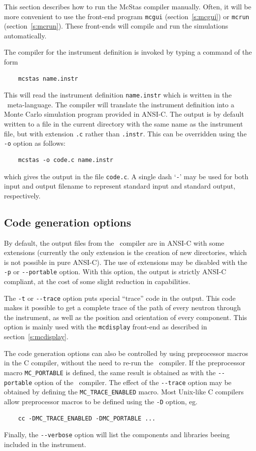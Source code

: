 This section describes how to run the McStas compiler manually. Often,
it will be more convenient to use the front-end program \verb+mcgui+
(section~\ref{s:mcgui}) or \verb+mcrun+ (section~\ref{s:mcrun}). These
front-ends will compile and run the simulations automatically.
 

The compiler for the \MCS{} instrument definition 
is invoked by typing a command of the form
\begin{verbatim}
    mcstas name.instr
\end{verbatim}
This will read the instrument definition \verb+name.instr+ which is
written in the \MCS\ meta-language. The compiler will translate the
instrument definition into a Monte Carlo simulation program provided in
ANSI-C. The output is by default written to a file in the current
directory with the same name as the instrument file, but with extension
\verb+.c+ rather than \verb+.instr+. This can be overridden using the
\verb+-o+ option as follows:
\begin{verbatim}
    mcstas -o code.c name.instr
\end{verbatim}
which gives the output in the file \verb+code.c+.
A single dash `\verb+-+' may be used for both input and output filename
to represent standard input and standard output, respectively.


\subsection{Code generation options}

By default, the output files from the \MCS\ compiler are in ANSI-C with
some extensions (currently the only extension is the creation of new
directories, which is not possible in pure ANSI-C). The use of
extensions may be disabled with the \verb+-p+ or \verb+--portable+
option. With this option, the output is strictly ANSI-C compliant, at
the cost of some slight reduction in capabilities.

The \verb+-t+ or \verb+--trace+ option puts special ``trace'' code in
the output. This code makes it possible to get a complete trace of the
path of every neutron through the instrument, as well as the position
and orientation of every component. This option is mainly used with the
\verb+mcdisplay+ front-end as described in section~\ref{s:mcdisplay}.

The code generation options can also be controlled by using preprocessor
macros in the C compiler, without the need to re-run the \MCS\
compiler. If the preprocessor macro \verb+MC_PORTABLE+ is defined, the
same result is obtained as with the \verb+--portable+ option of the
\MCS\ compiler. The effect of the \verb+--trace+ option may be obtained
by defining the \verb+MC_TRACE_ENABLED+ macro. Most Unix-like C
compilers allow preprocessor macros to be defined using the \verb+-D+
option, eg.
\begin{verbatim}
    cc -DMC_TRACE_ENABLED -DMC_PORTABLE ...
\end{verbatim}
Finally, the \verb+--verbose+ option will list the components and libraries beeing
included in the instrument.

